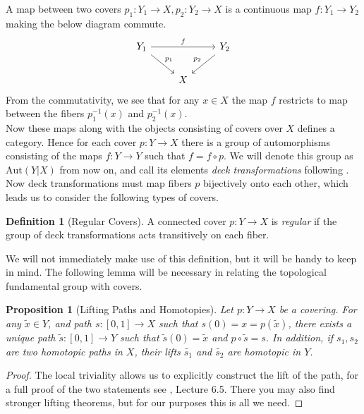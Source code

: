 \documentclass{article}
\theoremstyle{definition}
\newtheorem{definition}[theorem]{Definition}
\theoremstyle{remark}
\theoremstyle{plain}
\newtheorem{proposition}[theorem]{Proposition}
\begin{document}
\indent A map between two covers $p_1: Y_1 \to X, p_2: Y_2 \to X$ is a continuous map $f: Y_1 \to Y_2$ making the below diagram commute.
\[\begin{tikzcd}
	{Y_1} && {Y_2} \\
	& X
	\arrow["f", from=1-1, to=1-3]
	\arrow["{p_1}", from=1-1, to=2-2]
	\arrow["{p_2}"', from=1-3, to=2-2]
\end{tikzcd}\]
From the commutativity, we see that for any $x \in X$ the map $f$ restricts to map between the fibers $p_1^{-1}(x)$ and $p_2^{-1}(x)$.\\
\indent Now these maps along with the objects consisting of covers over $X$ defines a category.
Hence for each cover $p:Y \to X$ there is a group of automorphisms consisting of the maps $f: Y \to Y$ such that $f = f \circ p$.
We will denote this group as $\text{Aut}(Y|X)$ from now on, and call its elements \textit{deck transformations} following \cite{FomenkoFuchs}.
Now deck transformations must map fibers $p$ bijectively onto each other, which leads us to consider the following types of covers.

\begin{definition}[Regular Covers]
	A connected cover $p: Y \to X$ is \textit{regular} if the group of deck transformations acts transitively on each fiber.
\end{definition}

We will not immediately make use of this definition, but it will be handy to keep in mind.
The following lemma will be necessary in relating the topological fundamental group with covers.

\begin{proposition}[Lifting Paths and Homotopies]	
	Let $p: Y \to X$ be a covering. 
	For any $\widetilde{x} \in Y$, and path $s: [0,1] \to X$ such that $s(0) = x = p(\widetilde{x})$, there exists a unique path $\widetilde{s}:[0,1] \to Y$ such that $\widetilde{s}(0) = \widetilde{x}$ and $p \circ \widetilde{s} = s$.
	In addition, if $s_1, s_2$ are two homotopic paths in $X$, their lifts $\widetilde{s_1}$ and $\widetilde{s_2}$ are homotopic in $Y$.
\end{proposition}

\begin{proof}
	The local triviality allows us to explicitly construct the lift of the path, for a full proof of the two statements see \cite{FomenkoFuchs}, Lecture 6.5.
	There you may also find stronger lifting theorems, but for our purposes this is all we need.
\end{proof}
		
\end{document}

